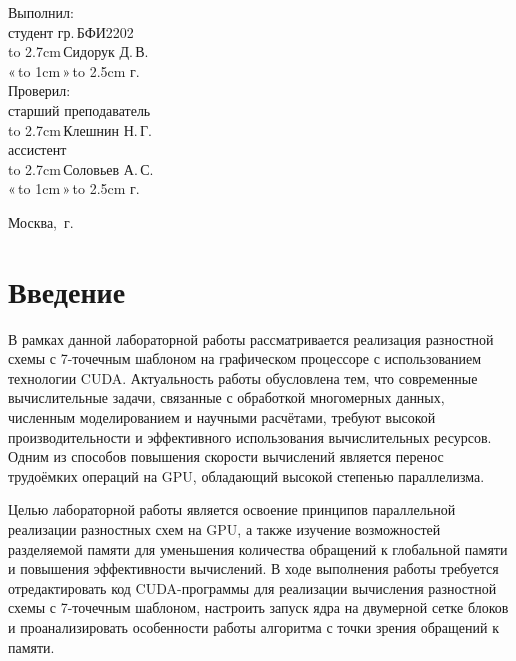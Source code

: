 \documentclass[14pt]{extarticle}
\makeatletter
\newcommand{\hrf}[1]{\hbox to #1{\hrulefill}} %
\newcounter{sectionc} %
\newcommand{\numbersections}{\renewcommand{\Hy@numberline}[1]{##1~}}
\newcommand{\nonumbersections}{\renewcommand{\Hy@numberline}[1]{}}
\let\oldsection\section
\renewcommand{\section}{\numbersections\oldsection}
\let\oldsectionc\sectionc
\renewcommand{\sectionc}{\nonumbersections\oldsectionc}
\renewcommand\tableofcontents{
	\pdfbookmark[sectionc]{\contentsname}{toc} %
	\sectionc*{\contentsname
		\@mkboth{\contentsname}{\contentsname}}
	\@starttoc{toc}
}
\makeatother
\begin{document}
\vfill %

\hfill %
\begin{minipage}{0.45\textwidth} %
	Выполнил:\\[2mm]
	студент гр.\,БФИ2202\\[2mm]
	\hrf{2.7cm}\,Сидорук Д.\,В.\\[2mm]
	«\,\hrf{1cm}\,»\,\hrf{2.5cm}\,\the\year{}\,г.\\[5mm]
	
	Проверил:\\[2mm]
	старший преподаватель\\[2mm]
	\hrf{2.7cm}\,Клешнин Н.\,Г.\\[2mm]
	ассистент\\[2mm]
	\hrf{2.7cm}\,Соловьев А.\,С.\\[2mm]
	«\,\hrf{1cm}\,»\,\hrf{2.5cm}\,\the\year{}\,г.
\end{minipage}%

\vfill

\centerline{Москва, \the\year{}\,г.} %
\thispagestyle{empty} %
\newpage %
\tableofcontents %
\newpage %

\section{Введение}

В рамках данной лабораторной работы рассматривается реализация разностной схемы с 7-точечным шаблоном на графическом процессоре с использованием технологии CUDA. Актуальность работы обусловлена тем, что современные вычислительные задачи, связанные с обработкой многомерных данных, численным моделированием и научными расчётами, требуют высокой производительности и эффективного использования вычислительных ресурсов. Одним из способов повышения скорости вычислений является перенос трудоёмких операций на GPU, обладающий высокой степенью параллелизма.

Целью лабораторной работы является освоение принципов параллельной реализации разностных схем на GPU, а также изучение возможностей разделяемой памяти для уменьшения количества обращений к глобальной памяти и повышения эффективности вычислений. В ходе выполнения работы требуется отредактировать код CUDA-программы для реализации вычисления разностной схемы с 7-точечным шаблоном, настроить запуск ядра на двумерной сетке блоков и проанализировать особенности работы алгоритма с точки зрения обращений к памяти.
\end{document}
